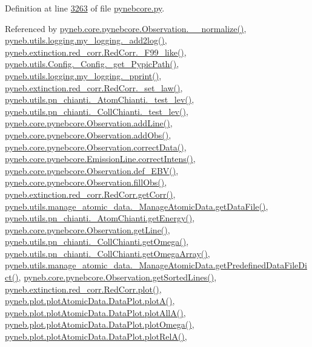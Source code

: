 Definition at line \hyperlink{pynebcore_8py_source_l03263}{3263} of file \hyperlink{pynebcore_8py_source}{pynebcore.\+py}.



Referenced by \hyperlink{pynebcore_8py_source_l03885}{pyneb.\+core.\+pynebcore.\+Observation.\+\_\+\+\_\+normalize()}, \hyperlink{logging_8py_source_l00059}{pyneb.\+utils.\+logging.\+my\+\_\+logging.\+\_\+add2log()}, \hyperlink{red__corr_8py_source_l00658}{pyneb.\+extinction.\+red\+\_\+corr.\+Red\+Corr.\+\_\+\+F99\+\_\+like()}, \hyperlink{_config_8py_source_l00086}{pyneb.\+utils.\+Config.\+\_\+\+Config.\+\_\+get\+\_\+\+Pypic\+Path()}, \hyperlink{logging_8py_source_l00051}{pyneb.\+utils.\+logging.\+my\+\_\+logging.\+\_\+pprint()}, \hyperlink{red__corr_8py_source_l00176}{pyneb.\+extinction.\+red\+\_\+corr.\+Red\+Corr.\+\_\+set\+\_\+law()}, \hyperlink{pn__chianti_8py_source_l00284}{pyneb.\+utils.\+pn\+\_\+chianti.\+\_\+\+Atom\+Chianti.\+\_\+test\+\_\+lev()}, \hyperlink{pn__chianti_8py_source_l00449}{pyneb.\+utils.\+pn\+\_\+chianti.\+\_\+\+Coll\+Chianti.\+\_\+test\+\_\+lev()}, \hyperlink{pynebcore_8py_source_l03436}{pyneb.\+core.\+pynebcore.\+Observation.\+add\+Line()}, \hyperlink{pynebcore_8py_source_l03467}{pyneb.\+core.\+pynebcore.\+Observation.\+add\+Obs()}, \hyperlink{pynebcore_8py_source_l03906}{pyneb.\+core.\+pynebcore.\+Observation.\+correct\+Data()}, \hyperlink{pynebcore_8py_source_l03325}{pyneb.\+core.\+pynebcore.\+Emission\+Line.\+correct\+Intens()}, \hyperlink{pynebcore_8py_source_l03861}{pyneb.\+core.\+pynebcore.\+Observation.\+def\+\_\+\+E\+B\+V()}, \hyperlink{pynebcore_8py_source_l03452}{pyneb.\+core.\+pynebcore.\+Observation.\+fill\+Obs()}, \hyperlink{red__corr_8py_source_l00211}{pyneb.\+extinction.\+red\+\_\+corr.\+Red\+Corr.\+get\+Corr()}, \hyperlink{manage__atomic__data_8py_source_l00297}{pyneb.\+utils.\+manage\+\_\+atomic\+\_\+data.\+\_\+\+Manage\+Atomic\+Data.\+get\+Data\+File()}, \hyperlink{pn__chianti_8py_source_l00346}{pyneb.\+utils.\+pn\+\_\+chianti.\+\_\+\+Atom\+Chianti.\+get\+Energy()}, \hyperlink{pynebcore_8py_source_l03543}{pyneb.\+core.\+pynebcore.\+Observation.\+get\+Line()}, \hyperlink{pn__chianti_8py_source_l00484}{pyneb.\+utils.\+pn\+\_\+chianti.\+\_\+\+Coll\+Chianti.\+get\+Omega()}, \hyperlink{pn__chianti_8py_source_l00461}{pyneb.\+utils.\+pn\+\_\+chianti.\+\_\+\+Coll\+Chianti.\+get\+Omega\+Array()}, \hyperlink{manage__atomic__data_8py_source_l00034}{pyneb.\+utils.\+manage\+\_\+atomic\+\_\+data.\+\_\+\+Manage\+Atomic\+Data.\+get\+Predefined\+Data\+File\+Dict()}, \hyperlink{pynebcore_8py_source_l03562}{pyneb.\+core.\+pynebcore.\+Observation.\+get\+Sorted\+Lines()}, \hyperlink{red__corr_8py_source_l00303}{pyneb.\+extinction.\+red\+\_\+corr.\+Red\+Corr.\+plot()}, \hyperlink{plot_atomic_data_8py_source_l00116}{pyneb.\+plot.\+plot\+Atomic\+Data.\+Data\+Plot.\+plot\+A()}, \hyperlink{plot_atomic_data_8py_source_l00188}{pyneb.\+plot.\+plot\+Atomic\+Data.\+Data\+Plot.\+plot\+All\+A()}, \hyperlink{plot_atomic_data_8py_source_l00372}{pyneb.\+plot.\+plot\+Atomic\+Data.\+Data\+Plot.\+plot\+Omega()}, \hyperlink{plot_atomic_data_8py_source_l00261}{pyneb.\+plot.\+plot\+Atomic\+Data.\+Data\+Plot.\+plot\+Rel\+A()}, 